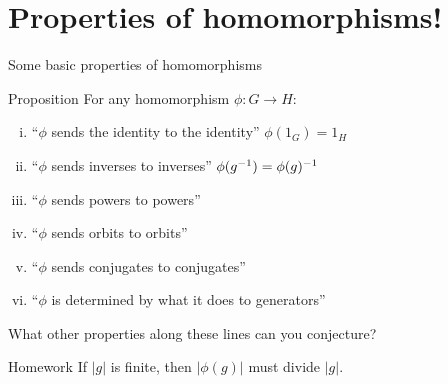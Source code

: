 \documentclass[8pt, handout]{beamer}
\newcommand{\Pause}{\pause}      %
\begin{document}
\section{Properties of homomorphisms!}

\begin{frame}{Some basic properties of homomorphisms}
  \begin{block}{Proposition}
    For any homomorphism $\phi\colon G\to H$: \Pause
    \begin{enumerate}[(i)]
    \item ``{$\phi$ sends the identity to the identity}'' 
    \hfill \pause $\phi(1_G) = 1_H$ \pause
    \item ``{$\phi$ sends inverses to inverses}''
    \hfill \pause $\phi(g^{-1}) = \phi(g)^{-1}$ \pause
    \item ``{$\phi$ sends powers to powers}'' \pause
    \item ``{$\phi$ sends orbits to orbits}'' \pause
    \item ``{$\phi$ sends conjugates to conjugates}'' \pause
    \item ``{$\phi$ is determined by what it does to generators}'' \pause
    \end{enumerate}
  \end{block}
  \medskip
  What other properties along these lines can you conjecture? \pause
  \begin{exampleblock}{Homework}
    If $|g|$ is finite, then $|\phi(g)|$ must divide $|g|$.
  \end{exampleblock}
\end{frame}

\end{document}
